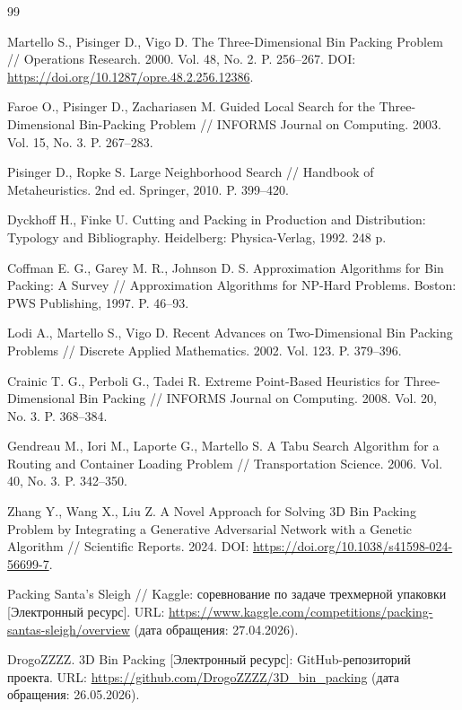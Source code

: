 \clearpage
\begin{thebibliography}{99}

Martello S., Pisinger D., Vigo D. The Three-Dimensional Bin Packing Problem // Operations Research. 2000. Vol. 48, No. 2. P. 256--267. DOI: \url{https://doi.org/10.1287/opre.48.2.256.12386}.

Faroe O., Pisinger D., Zachariasen M. Guided Local Search for the Three-Dimensional Bin-Packing Problem // INFORMS Journal on Computing. 2003. Vol. 15, No. 3. P. 267--283.

Pisinger D., Ropke S. Large Neighborhood Search // Handbook of Metaheuristics. 2nd ed. Springer, 2010. P. 399--420.

Dyckhoff H., Finke U. Cutting and Packing in Production and Distribution: Typology and Bibliography. Heidelberg: Physica-Verlag, 1992. 248 p.

Coffman E. G., Garey M. R., Johnson D. S. Approximation Algorithms for Bin Packing: A Survey // Approximation Algorithms for NP-Hard Problems. Boston: PWS Publishing, 1997. P. 46--93.

Lodi A., Martello S., Vigo D. Recent Advances on Two-Dimensional Bin Packing Problems // Discrete Applied Mathematics. 2002. Vol. 123. P. 379--396.

Crainic T. G., Perboli G., Tadei R. Extreme Point-Based Heuristics for Three-Dimensional Bin Packing // INFORMS Journal on Computing. 2008. Vol. 20, No. 3. P. 368--384.

Gendreau M., Iori M., Laporte G., Martello S. A Tabu Search Algorithm for a Routing and Container Loading Problem // Transportation Science. 2006. Vol. 40, No. 3. P. 342--350.

Zhang Y., Wang X., Liu Z. A Novel Approach for Solving 3D Bin Packing Problem by Integrating a Generative Adversarial Network with a Genetic Algorithm // Scientific Reports. 2024. DOI: \url{https://doi.org/10.1038/s41598-024-56699-7}.

Packing Santa's Sleigh // Kaggle: соревнование по задаче трехмерной упаковки [Электронный ресурс]. URL: \url{https://www.kaggle.com/competitions/packing-santas-sleigh/overview} (дата обращения: 27.04.2026).

DrogoZZZZ. 3D Bin Packing [Электронный ресурс]: GitHub-репозиторий проекта. URL: \url{https://github.com/DrogoZZZZ/3D_bin_packing} (дата обращения: 26.05.2026).

\end{thebibliography}
